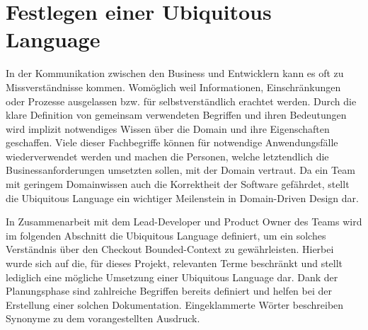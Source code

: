 \section{Festlegen einer Ubiquitous Language}

In der Kommunikation zwischen den Business und Entwicklern kann es oft zu Missverständnisse kommen. Womöglich weil Informationen, Einschränkungen oder Prozesse ausgelassen bzw. für selbstverständlich erachtet werden. Durch die klare Definition von gemeinsam verwendeten Begriffen und ihren Bedeutungen wird implizit notwendiges Wissen über die Domain und ihre Eigenschaften geschaffen. Viele dieser Fachbegriffe können für notwendige Anwendungsfälle wiederverwendet werden und machen die Personen, welche letztendlich die Businessanforderungen umsetzten sollen, mit der Domain vertraut. Da ein Team mit geringem Domainwissen auch die Korrektheit der Software gefährdet, stellt die Ubiquitous Language ein wichtiger Meilenstein in Domain-Driven Design dar.

In Zusammenarbeit mit dem Lead-Developer und \Gls{Product Owner} des Teams wird im folgenden Abschnitt die Ubiquitous Language definiert, um ein solches Verständnis über den Checkout Bounded-Context zu gewährleisten. Hierbei wurde sich auf die, für dieses Projekt, relevanten Terme beschränkt und stellt lediglich eine mögliche Umsetzung einer Ubiquitous Language dar. Dank der Planungsphase sind zahlreiche Begriffen bereits definiert und helfen bei der Erstellung einer solchen Dokumentation. Eingeklammerte Wörter beschreiben Synonyme zu dem vorangestellten Ausdruck.

